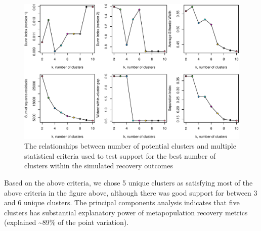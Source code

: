 \documentclass[
]{article}
\begin{document}
\begin{figure}[H]

{\centering \includegraphics{Managing_for_ecological_surprises_in_metapopulations_files/figure-latex/clustering analysis-1} 

}

\caption{The relationships between number of potential clusters and multiple statistical criteria used to test support for the best number of clusters within the simulated recovery outcomes}\label{fig:clustering analysis}
\end{figure}

Based on the above criteria, we chose 5 unique clusters as satisfying
most of the above criteria in the figure above, although there was good
support for between 3 and 6 unique clusters. The principal components
analysis indicates that five clusters has substantial explanatory power
of metapopulation recovery metrics (explained \textasciitilde89\% of the
point variation).
\end{document}

